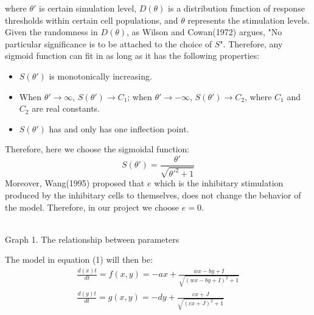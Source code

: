 \documentclass[12pt]{article}
\begin{document}
  where $\theta'$ is certain simulation level, $D(\theta)$ is a distribution function of response thresholds within certain cell populations, and $\theta$ represents the stimulation levels. Given the randomness in $D(\theta)$, as Wilson and Cowan(1972) argues, "No particular significance is to be attached to the choice of $S$". Therefore, any sigmoid function can fit in as long as it has the following properties:
  \begin{itemize}
    \item $S(\theta')$ is monotonically increasing.
    \item When $\theta'\to\infty$, $S(\theta')\to C_1$; when $\theta'\to -\infty$, $S(\theta') \to C_2$, where $C_1$ and $C_2$ are real constants. 
    \item $S(\theta')$ has and only has one inflection point.
  \end{itemize}
  Therefore, here we choose the sigmoidal function:
  \begin{equation}
    S(\theta')=\frac{\theta'}{\sqrt{\theta'^2+1}}
  \end{equation}
  Moreover, Wang(1995) proposed that $e$ which is the inhibitary stimulation produced by the inhibitary cells to themselves, does not change the behavior of the model. Therefore, in our project we choose $e=0$. 
\begin{center}
    \\
    \footnotesize{Graph 1. The relationship between parameters}
\end{center}

\indent The model in equation (1) will then be:
\begin{equation}
  \begin{matrix}
    \frac{d(x)t}{dt}=f(x,y)=-ax+\frac{wx-by+I}{\sqrt{(wx-by+I)^2+1}}
    \\
    \frac{d(y)t}{dt}=g(x,y)=-dy+\frac{cx+J}{\sqrt{(cx+J)^2+1}}
    \end{matrix}
\end{equation}
\end{document}
